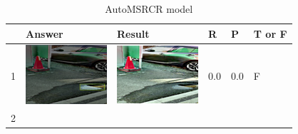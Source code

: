 \documentclass[10pt]{jarticle}
\begin{document}
    \begin{table}[H]
        \caption{AutoMSRCR model}
        \begin{tabular}{|l|l|l|l|l|l|}
        \hline
           & Answer & Result & R   & P   & T or F \\ \hline
        1  & \begin{minipage}{.1\textwidth}
            \centering
            \includegraphics[width=0.9\linewidth]{./fig/2tab1_a.png}
        \end{minipage}       & \begin{minipage}{.1\textwidth}
            \centering
            \includegraphics[width=0.9\linewidth]{./fig/2tab1_r.png}
           \end{minipage}       & 0.0 & 0.0 & F      \\ \hline
        2  & \begin{minipage}{.1\textwidth}
            \centering

\end{minipage}
\end{tabular}
\end{table}
\end{document}
